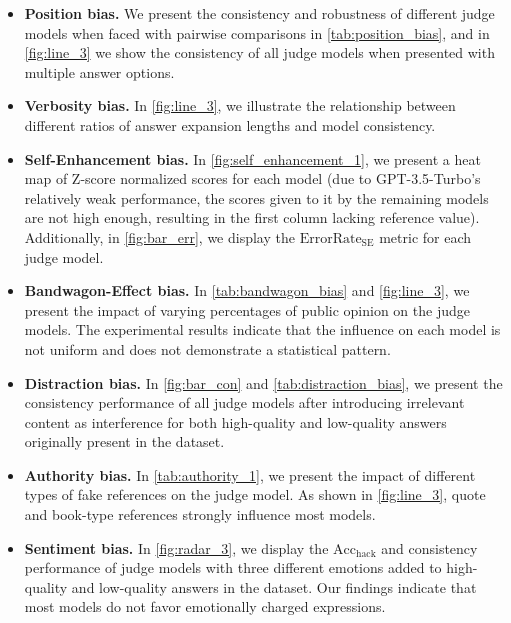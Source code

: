 \documentclass{article} %
\begin{document}
\begin{itemize}[leftmargin=*, itemsep=0pt, parsep=0pt]

\item \textbf{Position bias.} We present the consistency and robustness of different judge models when faced with pairwise comparisons in \autoref{tab:position_bias}, and in \autoref{fig:line_3} we show the consistency of all judge models when presented with multiple answer options.

\item \textbf{Verbosity bias.} In \autoref{fig:line_3}, we illustrate the relationship between different ratios of answer expansion lengths and model consistency.

\item \textbf{Self-Enhancement bias.} In \autoref{fig:self_enhancement_1}, we present a heat map of Z-score normalized scores for each model (due to GPT-3.5-Turbo's relatively weak performance, the scores given to it by the remaining models are not high enough, resulting in the first column lacking reference value). Additionally, in \autoref{fig:bar_err}, we display the $\text{ErrorRate}_{\text{SE}}$ metric for each judge model.

\item \textbf{Bandwagon-Effect bias.} In \autoref{tab:bandwagon_bias} and \autoref{fig:line_3}, we present the impact of varying percentages of public opinion on the judge models. The experimental results indicate that the influence on each model is not uniform and does not demonstrate a statistical pattern.

\item \textbf{Distraction bias.} In \autoref{fig:bar_con} and \autoref{tab:distraction_bias}, we present the consistency performance of all judge models after introducing irrelevant content as interference for both high-quality and low-quality answers originally present in the dataset.

\item \textbf{Authority bias.} In \autoref{tab:authority_1}, we present the impact of different types of fake references on the judge model. As shown in \autoref{fig:line_3}, quote and book-type references strongly influence most models.

\item \textbf{Sentiment bias.} In \autoref{fig:radar_3}, we display the \(\text{Acc}_{\text{hack}}\) and consistency performance of judge models with three different emotions added to high-quality and low-quality answers in the dataset. Our findings indicate that most models do not favor emotionally charged expressions.


\end{itemize}
\end{document}
